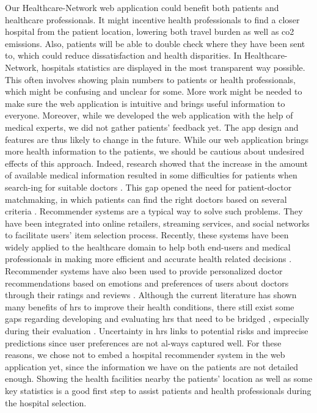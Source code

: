 Our Healthcare-Network web application could benefit both patients and healthcare professionals. It might incentive health professionals to find a closer hospital from the patient location, lowering both travel burden as well as \ac{co2} emissions. Also, patients will be able to double check where they have been sent to, which could reduce dissatisfaction and health disparities. In Healthcare-Network, hospitals statistics are displayed in the most transparent way possible. This often involves showing plain numbers to patients or health professionals, which might be confusing and unclear for some. More work might be needed to make sure the web application is intuitive and brings useful information to everyone. Moreover, while we developed the web application with the help of medical experts, we did not gather patients' feedback yet. The app design and features are thus likely to change in the future.
While our web application brings more health information to the patients, we should be cautious about undesired effects of this approach. Indeed, research showed that the increase in the amount of available medical information resulted in some difficulties for patients when search-ing for suitable doctors \cite{narducci_recommender_2015,hoens_reliable_2010}. This gap opened the need for patient-doctor matchmaking, in which patients can find the right doctors based on several criteria \cite{han_hybrid_2018}. Recommender systems are a typical way to solve such problems. They have been integrated into online retailers, streaming services, and social networks to facilitate users' item selection process. Recently, these systems have been widely applied to the healthcare domain to help both end-users and medical professionals in making more efficient and accurate health related decisions \cite{tran_recommender_2021}. Recommender systems have also been used to provide personalized doctor recommendations based on emotions and preferences of users about doctors through their ratings and reviews \cite{zhang_idoctor_2017}. Although the current literature has shown many benefits of \ac{hrs} to improve their health conditions, there still exist some gaps regarding developing and evaluating \ac{hrs} that need to be bridged \cite{tran_recommender_2021}, especially during their evaluation \cite{calero_valdez_recommender_2016}. Uncertainty in \ac{hrs} links to potential risks and imprecise predictions since user preferences are not al-ways captured well. For these reasons, we chose not to embed a hospital recommender system in the web application yet, since the information we have on the patients are not detailed enough. Showing the health facilities nearby the patients' location as well as some key statistics is a good first step to assist patients and health professionals during the hospital selection.

